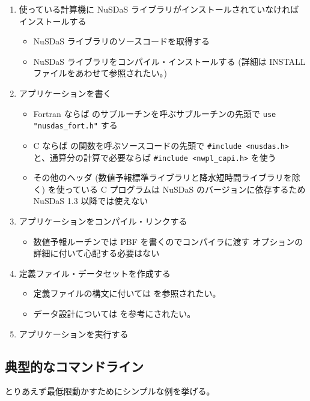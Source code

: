 \begin{enumerate}
\item 使っている計算機に NuSDaS ライブラリがインストールされていなければ
	インストールする
    \begin{itemize}
    \item NuSDaS ライブラリのソースコードを取得する
    \item NuSDaS ライブラリをコンパイル・インストールする
    (詳細は INSTALL ファイルをあわせて参照されたい。)
    \end{itemize}
\item アプリケーションを書く
    \begin{itemize}
    \item Fortran ならば
    	 のサブルーチンを呼ぶサブルーチンの先頭で
    	\verb|use "nusdas_fort.h"| する
    \item C ならば
    	 の関数を呼ぶソースコードの先頭で
    	\verb|#include <nusdas.h>| と、通算分の計算で必要ならば
    	\verb|#include <nwpl_capi.h>| を使う
    \item その他のヘッダ
	(数値予報標準ライブラリと降水短時間ライブラリを除く)
        を使っている C プログラムは
    	NuSDaS のバージョンに依存するため NuSDaS 1.3 以降では使えない
    \end{itemize}
\item アプリケーションをコンパイル・リンクする
    \begin{itemize}
    \item 数値予報ルーチンでは PBF を書くのでコンパイラに渡す
    オプションの詳細に付いて心配する必要はない
    \end{itemize}
\item 定義ファイル・データセットを作成する
    \begin{itemize}
    \item 定義ファイルの構文に付いては  を参照されたい。
    \item データ設計については  を参考にされたい。
    \end{itemize}
\item アプリケーションを実行する
\end{enumerate}


\subsection{典型的なコマンドライン}

とりあえず最低限動かすためにシンプルな例を挙げる。

